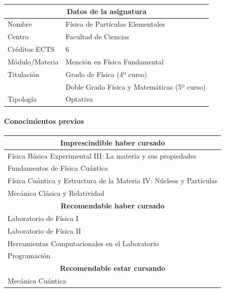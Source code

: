 \begin{center}
\begin{tabular}{|l|l|}
\hline\hline
\multicolumn{2}{|c|}{\textbf{Datos de la asignatura}}\\
\hline\hline
Nombre & Física de Partículas Elementales \\
\hline
Centro & Facultad de Ciencias \\
\hline
Créditos ECTS & 6 \\
\hline
Módulo/Materia & Mención en Física Fundamental \\
\hline
Titulación & Grado de Física (4º curso) \\
           & Doble Grado Física y Matemáticas (5º curso) \\
\hline
Tipología  & Optativa \\
\hline\hline
\end{tabular}
\end{center}


\paragraph{Conocimientos previos}

\begin{center}
\begin{tabular}{|l|}
\hline\hline
\multicolumn{1}{|c|}{\textbf{Imprescindible haber cursado}}\\
\hline\hline
Física Básica Experimental III: La materia y sus propiedades \\
\hline
Fundamentos de Física Cuántica \\
\hline
Física Cuántica y Estructura de la Materia IV: Núcleos y Partículas \\
\hline
Mecánica Clásica y Relatividad \\
\hline\hline
\multicolumn{1}{|c|}{\textbf{Recomendable haber cursado}}\\
\hline\hline
Laboratorio de Física I \\
\hline
Laboratorio de Física II \\
\hline
Herramientas Computacionales en el Laboratorio \\
\hline
Programación \\
\hline\hline
\multicolumn{1}{|c|}{\textbf{Recomendable estar cursando}}\\
\hline\hline
Mecánica Cuántica \\
\hline\hline
\end{tabular}
\end{center}

